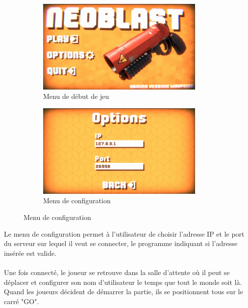 \documentclass[a4paper]{article}
\begin{document}
\begin{figure}[h]
    \begin{subfigure}{0.5\textwidth}
        \includegraphics[width=0.9\textwidth]{images/game/start_menu.png}
        \caption{Menu de début de jeu}
        \label{fig:start_menu}
    \end{subfigure}
        \begin{subfigure}{0.5\textwidth}
        \includegraphics[width=0.9\textwidth]{images/game/option_menu.png}
        \caption{Menu de configuration}
        \label{fig:option_menu}
    \end{subfigure}
\end{figure}
\noindent Le menu de configuration permet à l'utilisateur de choisir l'adresse IP et le port du serveur sur lequel il veut se connecter, le programme indiquant si l'adresse insérée est valide.\\
\\
Une fois connecté, le joueur se retrouve dans la salle d'attente où il peut se déplacer et configurer son nom d'utilisateur le temps que tout le monde soit là. Quand les joueurs décident de démarrer la partie, ils se positionnent tous sur le carré "GO".
\end{document}
